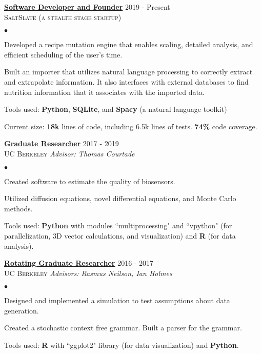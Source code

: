 \documentclass{article}
\newcommand{\experience}[4]{{\vspace{-2pt}\bf{\underline{#1}}} \hfill  #2\\{\textsc{#3} \hfill \emph{#4}\\  }}
\newenvironment{achievements}{\begin{list}{$\bullet$}{\topsep 0pt \itemsep -2pt}}{\vspace*{4pt}\end{list}}
\begin{document}
\experience{Software Developer and Founder}{2019 - Present}{SaltSlate \textnormal{(a stealth stage startup)}}{}
\begin{achievements}
	\item Developed a recipe mutation engine that enables scaling, detailed analysis, and efficient scheduling of the user's time.
	
	\item Built an importer that utilizes natural language processing to correctly extract and extrapolate information. It also interfaces with external databases to find nutrition information that it associates with the imported data. 
	
	\item Tools used: \textbf{Python}, \textbf{SQLite}, and \textbf{Spacy} (a natural language toolkit)
	\item Current size: \textbf{18k} lines of code, including 6.5k lines of tests. \textbf{74\%} code coverage.
	
	\end{achievements}


\experience{Graduate Researcher}{2017 - 2019}{UC Berkeley}{Advisor: Thomas Courtade}
\begin{achievements}
	\item Created software to estimate the quality of biosensors.
	\item Utilized diffusion equations, novel differential equations, and Monte Carlo methods.
	
    \item Tools used: \textbf{Python} with modules ``multiprocessing" and ``vpython" (for parallelization, 3D vector calculations, and visualization) and \textbf{R} (for data analysis).
\end{achievements}

\experience{Rotating Graduate Researcher}{2016 - 2017}{UC Berkeley}{Advisors: Rasmus Neilson, Ian Holmes}
\begin{achievements}

	\item Designed and implemented a simulation to test assumptions about data generation. 
	\item Created a stochastic context free grammar. Built a parser for the grammar. \item Tools used: \textbf{R} with ``ggplot2" library (for data visualization) and \textbf{Python}. 
	
	
\end{achievements}
\end{document}
